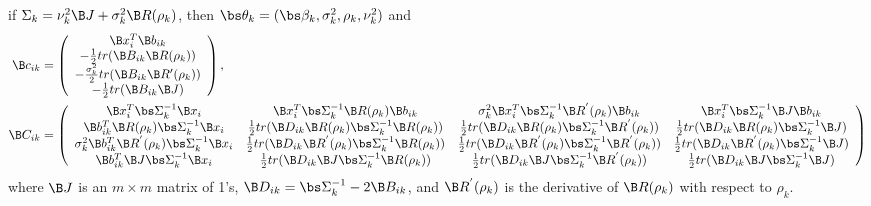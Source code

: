 \begin{theorem}
if $\Sigma_{k}=\nu_{k}^{2}\B J+\sigma_{k}^{2}\B R(\rho_{k})$, then $\bs\theta_{k}=(\bs\beta_{k},\sigma^{2}_{k},\rho_{k},\nu_{k}^{2})$ and
\begin{align*}
\B c_{ik}&=\left( \begin{array}{c}\B x_{i}^{T}\B b_{ik}\\ -\frac{1}{2}tr( \B B_{ik} \B R(\rho_{k}))\\ -\frac{\sigma^{2}_{k}}{2}tr( \B B_{ik} \B R'(\rho_{k}))\\
-\frac{1}{2}tr( \B B_{ik} \B J)
\end{array}\right),\\
\B C_{ik}&=\left(\begin{array}{cccc} \B x_{i}^{T}\bs\Sigma_{k}^{-1}\B x_{i}& \B x_{i}^{T}\bs\Sigma_{k}^{-1}\B R(\rho_{k})\B b_{ik}&\sigma^{2}_{k}\B x_{i}^{T} \bs\Sigma^{-1}_{k}\B R^{'}(\rho_{k})\B b_{ik}&\B x_{i}^{T} \bs\Sigma^{-1}_{k}\B J \B b_{ik}\\  
\B b^{T}_{ik}\B R(\rho_{k})\bs\Sigma_{k}^{-1}\B x_{i}&\frac{1}{2}tr(\B D_{ik}\B R(\rho_{k})\bs\Sigma_{k}^{-1}\B R(\rho_{k}))&\frac{1}{2}tr(\B D_{ik}\B R(\rho_{k})\bs\Sigma_{k}^{-1}\B R^{'}(\rho_{k}))&\frac{1}{2}tr(\B D_{ik}\B R(\rho_{k})\bs\Sigma_{k}^{-1}\B J)\\ 
\sigma^{2}_{k}\B b_{ik}^{T}\B R^{'}(\rho_{k}) \bs\Sigma^{-1}_{k}\B x_{i}&\frac{1}{2}tr(\B D_{ik}\B R^{'}(\rho_{k})\bs\Sigma_{k}^{-1}\B R(\rho_{k}))&\frac{1}{2}tr(\B D_{ik}\B R^{'}(\rho_{k})\bs\Sigma_{k}^{-1}\B R^{'}(\rho_{k}))&\frac{1}{2}tr(\B D_{ik}\B R^{'}(\rho_{k})\bs\Sigma_{k}^{-1}\B J)\\
 \B b_{ik}^{T}\B J \bs\Sigma^{-1}_{k}\B x_{i}&\frac{1}{2}tr(\B D_{ik}\B J\bs\Sigma_{k}^{-1}\B R(\rho_{k}))&\frac{1}{2}tr(\B D_{ik}\B J\bs\Sigma_{k}^{-1}\B R^{'}(\rho_{k}))&\frac{1}{2}tr(\B D_{ik}\B J\bs\Sigma_{k}^{-1}\B J)\\
\end{array} \right)
\end{align*}
where $\B J$ is an $m\times m$ matrix of 1's, $\B D_{ik} = \bs\Sigma_{k}^{-1}-2\B B_{ik}$, and $\B R^{'}(\rho_{k})$ is the derivative  of $\B R(\rho_{k})$ with respect to $\rho_{k}$. 
\end{theorem}

